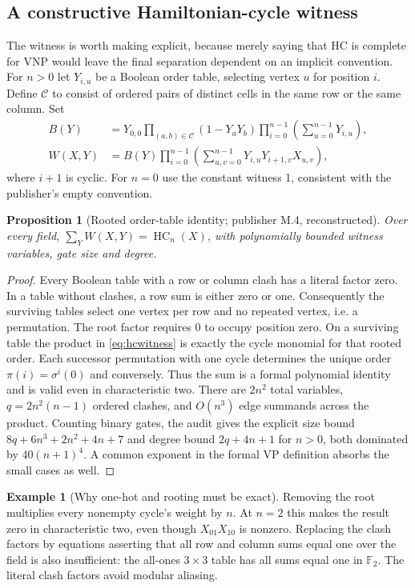 \documentclass[11pt,letterpaper]{article}
\newtheorem{proposition}[theorem]{Proposition}
\theoremstyle{definition}\newtheorem{definition}[theorem]{Definition}\newtheorem{example}[theorem]{Example}
\theoremstyle{remark}\newtheorem{remark}[theorem]{Remark}
\newcommand{\HC}{\operatorname{HC}}
\newcommand{\F}{\mathbb{F}}
\begin{document}
\subsection{A constructive Hamiltonian-cycle witness}\label{sec:hcwitness}
The witness is worth making explicit, because merely saying that HC is complete for VNP would leave the final separation dependent on an implicit convention. For $n>0$ let $Y_{i,u}$ be a Boolean order table, selecting vertex $u$ for position $i$. Define $\mathcal C$ to consist of ordered pairs of distinct cells in the same row or the same column. Set
\begin{align}
 B(Y)&=Y_{0,0}\prod_{(a,b)\in\mathcal C}(1-Y_aY_b)
              \prod_{i=0}^{n-1}\left(\sum_{u=0}^{n-1}Y_{i,u}\right),\\
 W(X,Y)&=B(Y)\prod_{i=0}^{n-1}\left(\sum_{u,v=0}^{n-1}
                 Y_{i,u}Y_{i+1,v}X_{u,v}\right),\label{eq:hcwitness}
\end{align}
where $i+1$ is cyclic. For $n=0$ use the constant witness 1, consistent with the publisher's empty convention.
\begin{proposition}[Rooted order-table identity; publisher M.4, reconstructed]\label{prop:hc}
Over every field, $\sum_Y W(X,Y)=\HC_n(X)$, with polynomially bounded witness variables, gate size and degree.
\end{proposition}
\begin{proof}
Every Boolean table with a row or column clash has a literal factor zero. In a table without clashes, a row sum is either zero or one. Consequently the surviving tables select one vertex per row and no repeated vertex, i.e. a permutation. The root factor requires $0$ to occupy position zero. On a surviving table the product in \eqref{eq:hcwitness} is exactly the cycle monomial for that rooted order. Each successor permutation with one cycle determines the unique order $\pi(i)=\sigma^i(0)$ and conversely. Thus the sum is a formal polynomial identity and is valid even in characteristic two. There are $2n^2$ total variables, $q=2n^2(n-1)$ ordered clashes, and $O(n^3)$ edge summands across the product. Counting binary gates, the audit gives the explicit size bound $8q+6n^3+2n^2+4n+7$ and degree bound $2q+4n+1$ for $n>0$, both dominated by $40(n+1)^4$. A common exponent in the formal VP definition absorbs the small cases as well.
\end{proof}
\begin{example}[Why one-hot and rooting must be exact]
Removing the root multiplies every nonempty cycle's weight by $n$. At $n=2$ this makes the result zero in characteristic two, even though $X_{01}X_{10}$ is nonzero. Replacing the clash factors by equations asserting that all row and column sums equal one over the field is also insufficient: the all-ones $3\times3$ table has all sums equal one in $\F_2$. The literal clash factors avoid modular aliasing.
\end{example}
\end{document}
